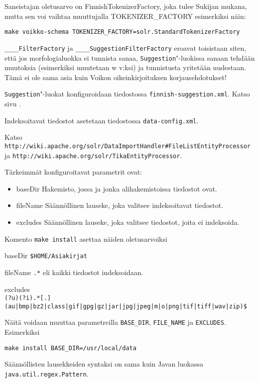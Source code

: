 \documentclass[12pt,a4paper]{scrartcl}
\begin{document}
Saneistajan oletusarvo on FinnishTokenizerFactory, joka tulee Sukijan
mukana, mutta sen voi vaihtaa muuttujalla TOKENIZER\_FACTORY
esimerkiksi näin:

\verb|make voikko-schema TOKENIZER_FACTORY=solr.StandardTokenizerFactory|

\verb=____FilterFactory= ja \verb=____SuggestionFilterFactory= eroavat
toisistaan siten, että jos morfologialuokka ei tunnista sanaa,
\verb=Suggestion="-luokissa sanaan tehdään muutoksia (esimerkiksi
muutetaan w v:ksi) ja tunnistusta yritetään uudestaan. Tämä ei ole
sama asia kuin Voikon oikeinkirjoituksen korjausehdotukset!

\verb=Suggestion="-luokat konfiguroidaan tiedostossa
\verb|finnish-suggestion.xml|. Katso sivu .

\bigskip
Indeksoitavat tiedostot asetetaan tiedostossa \verb|data-config.xml|.

Katso \\
\verb|http://wiki.apache.org/solr/DataImportHandler#FileListEntityProcessor| \\
ja
\verb|http://wiki.apache.org/solr/TikaEntityProcessor|.

Tärkeimmät konfiguroitavat parametrit ovat:

\begin{itemize}
\item baseDir
Hakemisto, jossa ja jonka alihakemistoissa tiedostot ovat.

\item fileName
Säännöllinen lauseke, joka valitsee indeksoitavat tiedostot.

\item excludes
Säännöllinen lauseke, joka valitsee tiedostot, joita ei indeksoida.
\end{itemize}

Komento \verb|make install| asettaa näiden oletusarvoiksi

baseDir \verb|$HOME/Asiakirjat|

fileName \verb|.*| eli kaikki tiedostot indeksoidaan.

excludes \\
{\footnotesize \verb+(?u)(?i).*[.](au|bmp|bz2|class|gif|gpg|gz|jar|jpg|jpeg|m|o|png|tif|tiff|wav|zip)$+}


Näitä voidaan muuttaa parametreilla \verb|BASE_DIR|,
\verb|FILE_NAME| ja
\verb|EXCLUDES|. Esimerkiksi

\verb|make install BASE_DIR=/usr/local/data|

Säännöllisten lausekkeiden syntaksi on sama kuin Javan luokassa \\
\verb=java.util.regex.Pattern=.
\end{document}
